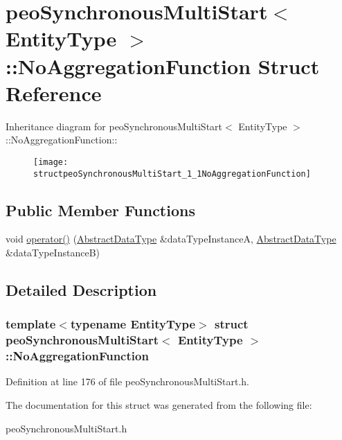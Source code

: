 \hypertarget{structpeoSynchronousMultiStart_1_1NoAggregationFunction}{
\section{peo\-Synchronous\-Multi\-Start$<$ Entity\-Type $>$::No\-Aggregation\-Function Struct Reference}
\label{structpeoSynchronousMultiStart_1_1NoAggregationFunction}
}
Inheritance diagram for peo\-Synchronous\-Multi\-Start$<$ Entity\-Type $>$::No\-Aggregation\-Function::\begin{figure}[H]
\begin{center}
\leavevmode
\texttt{[image: structpeoSynchronousMultiStart\_1\_1NoAggregationFunction]}
\end{center}
\end{figure}
\subsection*{Public Member Functions}
\begin{CompactItemize}
\item 
\hypertarget{structpeoSynchronousMultiStart_1_1NoAggregationFunction_d094bb3cca92a48de0afadf576cda044}{
void \hyperlink{structpeoSynchronousMultiStart_1_1NoAggregationFunction_d094bb3cca92a48de0afadf576cda044}{operator()} (\hyperlink{structpeoSynchronousMultiStart_1_1AbstractDataType}{Abstract\-Data\-Type} \&data\-Type\-Instance\-A, \hyperlink{structpeoSynchronousMultiStart_1_1AbstractDataType}{Abstract\-Data\-Type} \&data\-Type\-Instance\-B)}
\label{structpeoSynchronousMultiStart_1_1NoAggregationFunction_d094bb3cca92a48de0afadf576cda044}

\end{CompactItemize}


\subsection{Detailed Description}
\subsubsection*{template$<$typename Entity\-Type$>$ struct peo\-Synchronous\-Multi\-Start$<$ Entity\-Type $>$::No\-Aggregation\-Function}





Definition at line 176 of file peo\-Synchronous\-Multi\-Start.h.

The documentation for this struct was generated from the following file:\begin{CompactItemize}
\item 
peo\-Synchronous\-Multi\-Start.h\end{CompactItemize}
